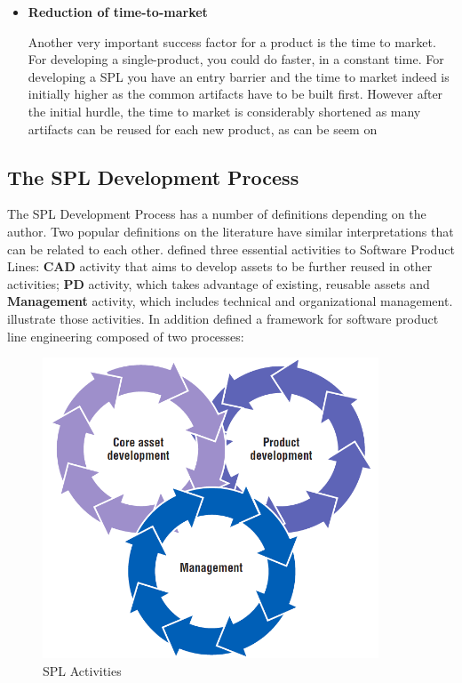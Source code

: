 \begin{itemize}
\item \textbf{Reduction of time-to-market}


Another very important success factor for a product is the time to market.  For developing a single-product, you could do faster, in a constant time. For developing a \acf{SPL} you have an entry barrier and the time to market indeed is initially higher as the common artifacts have to be built first. However after the initial  hurdle, the time to market is considerably shortened as many artifacts can be reused for each new product, as can be seem on 




\end{itemize}


\subsection{The SPL Development Process}

The \acf{SPL} Development Process has a number of definitions depending on the author. Two popular definitions on the literature \citep{clements2002software,Pohl2005} have similar interpretations that can be related to each other. \citet{clements2002software} defined three essential activities to Software Product Lines: \textbf{\acf{CAD}} activity that aims to develop assets to be further reused in other activities; \textbf{\acf{PD}} activity, which takes advantage of existing, reusable assets and \textbf{Management} activity, which includes technical and organizational management.  illustrate those activities. In addition \cite{Pohl2005} defined a framework for software product line engineering composed of two processes:

\begin{figure}[htp]
\begin{center}
  \includegraphics[width=10cm]{chapters/background/img/SPLactivities.png}
  \caption[SPL Activities]{SPL Activities \citep{clements2002software}}
  \label{fg:spl-activities}
\end{center}
\end{figure}


